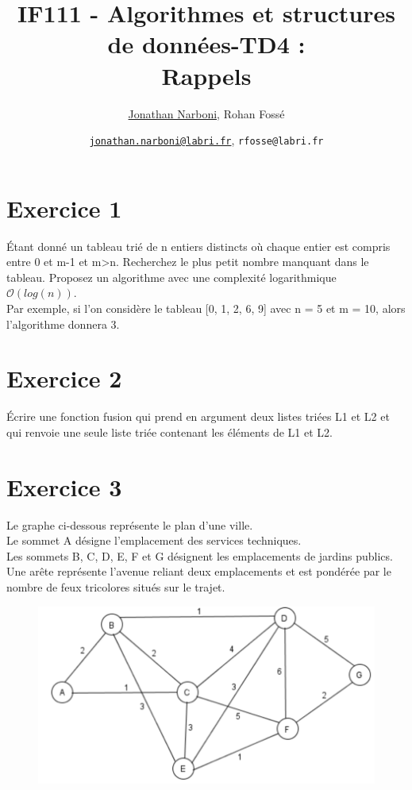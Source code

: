 \documentclass[10pt,a4paper]{article}
\title{IF111 - Algorithmes et structures de données-TD4 :\\ Rappels}
\date{}
\author{\underline{Jonathan Narboni}, Rohan Fossé}
\date{\underline{\texttt{jonathan.narboni@labri.fr}}, \texttt{rfosse@labri.fr}}
\begin{document}
\maketitle

\section*{Exercice 1}
Étant donné un tableau trié de n entiers distincts où chaque entier est compris entre 0 et m-1 et m>n. Recherchez le plus petit nombre manquant dans le tableau. Proposez un algorithme avec une complexité logarithmique $\mathcal{O}(log(n))$.\\
Par exemple, si l'on considère le tableau [0, 1, 2, 6, 9] avec n = 5 et m = 10, alors l'algorithme donnera 3.

\section*{Exercice 2}
Écrire une fonction fusion qui prend en argument deux listes triées L1 et L2 et qui renvoie une seule liste triée contenant les éléments de L1 et L2.

\section*{Exercice 3}
 Le graphe ci-dessous représente le plan d'une ville.\\

Le sommet A désigne l'emplacement des services techniques.\\

Les sommets B, C, D, E, F et G désignent les emplacements de jardins publics. Une arête représente l'avenue reliant deux emplacements et est pondérée par le nombre de feux tricolores situés sur le trajet. \\

\begin{figure}[h!]
    \centering
    \includegraphics[scale=0.6]{Djisktra.png}
    \label{fig:my_label}
\end{figure}
\end{document}
